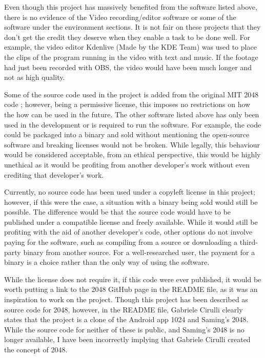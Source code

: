 \documentclass{article}
\begin{document}
Even though this project has massively benefited from the software listed above, there is no evidence of the Video recording/editor software or some of the software under the environment sections. It is not fair on these projects that they don't get the credit they deserve when they enable a task to be done well. For example, the video editor Kdenlive (Made by the KDE Team) was used to place the clips of the program running in the video with text and music. If the footage had just been recorded with OBS, the video would have been much longer and not as high quality.

Some of the source code used in the project is added from the original MIT 2048 code \cite{game2048}; however, being a permissive license, this imposes no restrictions on how the how can be used in the future. The other software listed above has only been used in the development or is required to run the software. For example, the code could be packaged into a binary and sold without mentioning the open-source software and  breaking licenses would not be broken. While legally, this behaviour would be considered acceptable, from an ethical perspective, this would be highly unethical as it would be profiting from another developer's work without even crediting that developer's work.

Currently, no source code has been used under a copyleft license in this project; however, if this were the case, a situation with a binary being sold would still be possible. The difference would be that the source code would have to be published under a compatible license and freely available. While it would still be profiting with the aid of another developer's code, other options do not involve paying for the software, such as compiling from a source or downloading a third-party binary from another source. For a well-researched user, the payment for a binary is a choice rather than the only way of using the software.

While the license does not require it, if this code were ever published, it would be worth putting a link to the 2048 GitHub page \cite{game2048} in the README file, as it was an inspiration to work on the project. Though this project \cite{game2048} has been described as  source code for 2048, however, in the README file, Gabriele Cirulli clearly states that the project is a clone of the Android app 1024 and Saming's 2048. While the source code for neither of these is public, and Saming's 2048 is no longer available, I have been incorrectly implying that Gabriele Cirulli created the concept of 2048.
\end{document}
